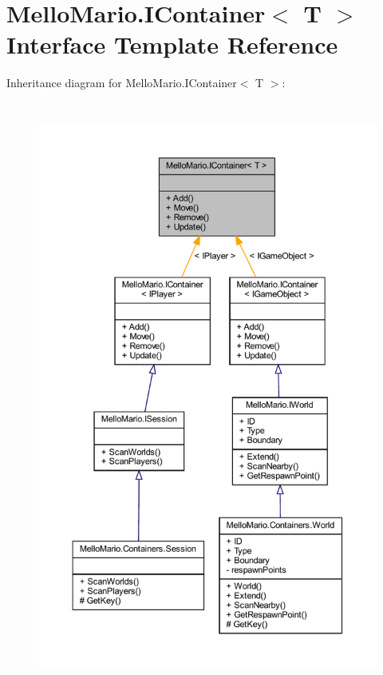 \section{Mello\+Mario.\+I\+Container$<$ T $>$ Interface Template Reference}
\label{interfaceMelloMario_1_1IContainer}


Inheritance diagram for Mello\+Mario.\+I\+Container$<$ T $>$\+:
\nopagebreak
\begin{figure}[H]
\begin{center}
\leavevmode
\includegraphics[height=550pt]{interfaceMelloMario_1_1IContainer__inherit__graph}
\end{center}
\end{figure}


